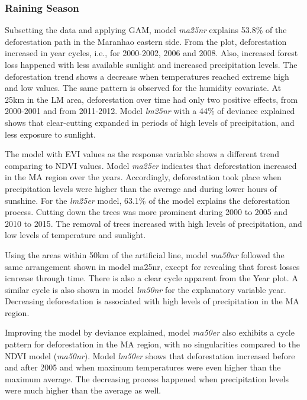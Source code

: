 \subsubsection{Raining Season}
Subsetting the data and applying GAM, model \textit{ma25nr} explains 53.8\% of the deforestation path in the Maranhao eastern side. From the plot, deforestation increased in year cycles, i.e., for 2000-2002, 2006 and 2008. Also, increased forest loss happened with less available sunlight and increased precipitation levels. The deforestation trend shows a decrease when temperatures reached extreme high and low values. The same pattern is observed for the humidity covariate. At 25km in the LM area, deforestation over time had only two positive effects, from 2000-2001 and from 2011-2012. Model \textit{lm25nr} with a 44\% of deviance explained shows that clear-cutting expanded in periods of high levels of precipitation, and less exposure to sunlight. 

The model with EVI values as the response variable shows a different trend comparing to NDVI values. Model \textit{ma25er} indicates that deforestation increased in the MA region over the years. Accordingly, deforestation took place when precipitation levels were higher than the average and during lower hours of sunshine. For the \textit{lm25er} model, 63.1\% of the model explains the deforestation process. Cutting down the trees was more prominent during 2000 to 2005 and 2010 to 2015. The removal of trees increased with high levels of precipitation, and low levels of temperature and sunlight. 

Using the areas within 50km of the artificial line, model \textit{ma50nr} followed the same arrangement shown in model ma25nr, except for revealing that forest losses icnrease through time. There is also a clear cycle apparent from the Year plot. A similar cycle is also shown in model \textit{lm50nr} for the explanatory variable year. Decreasing deforestation is associated with high levels of precipitation in the MA region. 

Improving the model by deviance explained, model \textit{ma50er} also exhibits a cycle pattern for deforestation in the MA region, with no singularities compared to the NDVI model (\textit{ma50nr}). Model \textit{lm50er} shows that deforestation increased before and after 2005 and when maximum temperatures were even higher than the maximum average. The decreasing process happened when precipitation levels were much higher than the average as well. 

